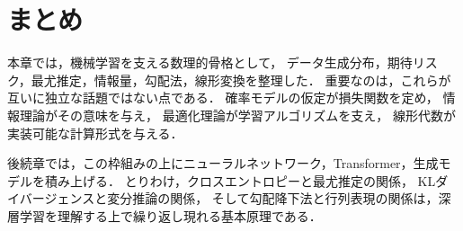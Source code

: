 \section{まとめ}
\label{sec:ml-basics-summary}

本章では，機械学習を支える数理的骨格として，
データ生成分布，期待リスク，最尤推定，情報量，勾配法，線形変換を整理した．
重要なのは，これらが互いに独立な話題ではない点である．
確率モデルの仮定が損失関数を定め，
情報理論がその意味を与え，
最適化理論が学習アルゴリズムを支え，
線形代数が実装可能な計算形式を与える．

後続章では，この枠組みの上にニューラルネットワーク，Transformer，生成モデルを積み上げる．
とりわけ，クロスエントロピーと最尤推定の関係，
KLダイバージェンスと変分推論の関係，
そして勾配降下法と行列表現の関係は，深層学習を理解する上で繰り返し現れる基本原理である．

